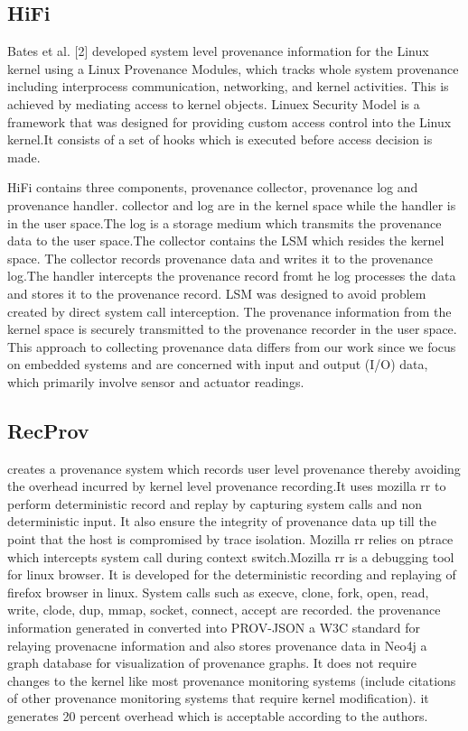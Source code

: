 \subsection{HiFi}
Bates et al. [2] developed system level provenance information for the Linux kernel using a Linux Provenance Modules, which tracks whole system provenance including interprocess communication, networking, and kernel activities. This is achieved by mediating access to kernel objects. Linuex Security Model is a framework that was designed for providing custom access control into the Linux kernel.It consists of a set of hooks which is executed before access decision is made.

HiFi contains three components, provenance collector, provenance log and provenance handler. collector and log are in the kernel space while the handler is in the user space.The log is a storage medium which transmits the provenance data to the user space.The collector contains the LSM which resides the kernel space. The collector records provenance data and writes it to the provenance log.The handler intercepts the provenance record fromt he log processes the data and stores it to the provenance record. LSM was designed to avoid problem created by direct system call interception. The provenance information from the kernel space is securely transmitted to the provenance recorder in the user space. This approach to collecting provenance data differs from our work since we focus on embedded systems and are concerned with input and output (I/O) data, which primarily involve sensor and actuator readings.

\subsection{RecProv}

creates a provenance system which records user level provenance thereby avoiding the overhead incurred by kernel level provenance recording.It uses mozilla rr to perform deterministic record and replay by capturing system calls  and non deterministic input. It also ensure the integrity of provenance data up till the point that the host is compromised by trace isolation. Mozilla rr relies on ptrace which intercepts system call during context switch.Mozilla rr is a debugging tool for linux browser. It is developed for the deterministic recording and replaying of firefox browser in linux. System calls such as execve, clone, fork, open, read, write, clode, dup, mmap, socket, connect, accept are recorded. the provenance information generated in converted into PROV-JSON a W3C standard for relaying provenacne information and also stores provenance data in Neo4j a graph database for visualization of provenance graphs. It does not require changes to the kernel like most provenance monitoring systems (include citations of other provenance monitoring systems that require kernel modification). it generates 20 percent overhead which is acceptable according to the authors.

